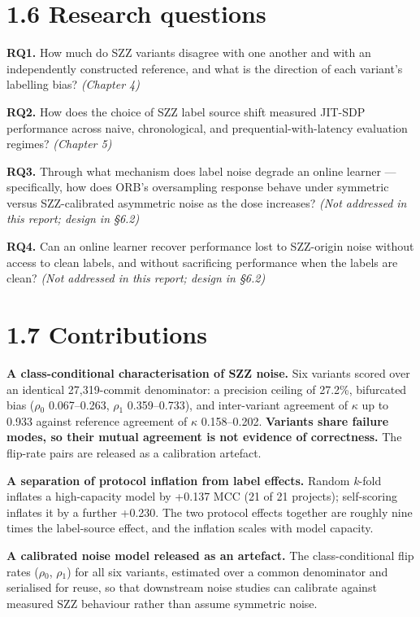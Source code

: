 \section{1.6 Research questions}\label{research-questions}

\textbf{RQ1.} How much do SZZ variants disagree with one another and
with an independently constructed reference, and what is the direction
of each variant's labelling bias? \emph{(Chapter 4)}

\textbf{RQ2.} How does the choice of SZZ label source shift measured
JIT-SDP performance across naive, chronological, and
prequential-with-latency evaluation regimes? \emph{(Chapter 5)}

\textbf{RQ3.} Through what mechanism does label noise degrade an online
learner --- specifically, how does ORB's oversampling response behave
under symmetric versus SZZ-calibrated asymmetric noise as the dose
increases? \emph{(Not addressed in this report; design in \S{}6.2)}

\textbf{RQ4.} Can an online learner recover performance lost to
SZZ-origin noise without access to clean labels, and without sacrificing
performance when the labels are clean? \emph{(Not addressed in this
report; design in \S{}6.2)}

\section{1.7 Contributions}\label{contributions}

\textbf{A class-conditional characterisation of SZZ noise.} Six variants
scored over an identical 27,319-commit denominator: a precision ceiling
of 27.2\%, bifurcated bias (\ensuremath{\rho}\ensuremath{_0} 0.067--0.263, \ensuremath{\rho}\ensuremath{_1} 0.359--0.733), and
inter-variant agreement of \ensuremath{\kappa} up to 0.933 against reference agreement of
\ensuremath{\kappa} 0.158--0.202. \textbf{Variants share failure modes, so their mutual
agreement is not evidence of correctness.} The flip-rate pairs are
released as a calibration artefact.

\textbf{A separation of protocol inflation from label effects.} Random
\emph{k}-fold inflates a high-capacity model by +0.137 MCC (21 of 21
projects); self-scoring inflates it by a further +0.230. The two
protocol effects together are roughly nine times the label-source
effect, and the inflation scales with model capacity.

\textbf{A calibrated noise model released as an artefact.} The
class-conditional flip rates (\ensuremath{\rho}\ensuremath{_0}, \ensuremath{\rho}\ensuremath{_1}) for all six variants, estimated
over a common denominator and serialised for reuse, so that downstream
noise studies can calibrate against measured SZZ behaviour rather than
assume symmetric noise.

